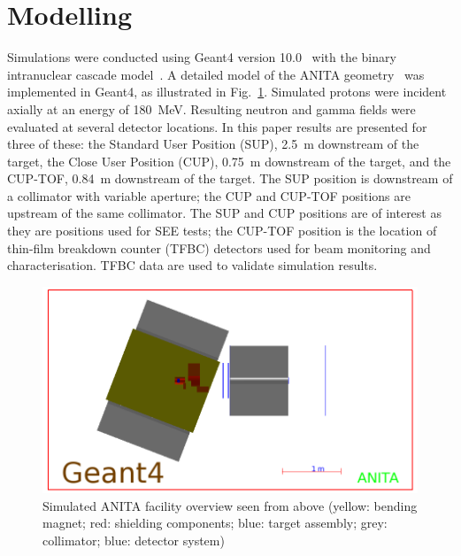 \documentclass[11pt,a4paper]{IEEEtran}
\let\MYoriglatexcaption\caption
\renewcommand{\caption}[2][\relax]{\MYoriglatexcaption[#2]{#2}}
\begin{document}
\section{Modelling}
Simulations were conducted using Geant4 version 10.0~\cite{Agostinelli2003,Allison2006} with the binary intranuclear cascade model~\cite{Platt2013}.
A detailed model of the ANITA geometry~\cite{Prokofiev2009,Prokofiev2014} was implemented in Geant4, as illustrated in Fig.~\ref{fig:ANITAoverview}.
Simulated protons were incident axially at an energy of \SI{180}{\MeV}.
Resulting neutron and gamma fields were evaluated at several detector locations.
In this paper results are presented for three of these: the Standard User Position (SUP), \SI{2.5}{\m} downstream of the target, the Close User Position (CUP), \SI{0.75}{\m} downstream of the target, and the CUP-TOF, \SI{0.84}{m} downstream of the target.
The SUP position is downstream of a collimator with variable aperture; the CUP and CUP-TOF positions are upstream of the same collimator.
The SUP and CUP positions are of interest as they are positions used for SEE tests; the CUP-TOF position is the location of thin-film breakdown counter (TFBC) detectors used for beam monitoring and characterisation.
TFBC data are used to validate simulation results.

\begin{figure}[t]
	\centering
	\includegraphics[width=\columnwidth]{overview.png}
	\caption{
        Simulated ANITA facility overview seen from above (yellow: bending magnet; red: shielding components; blue: target assembly; grey: collimator; blue: detector system)
    }
	\label{fig:ANITAoverview}
\end{figure}
\end{document}
